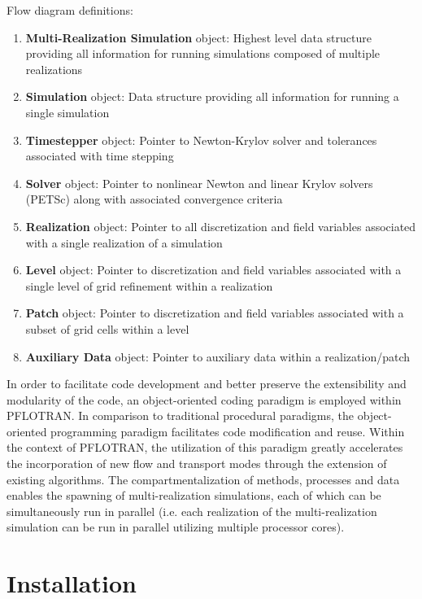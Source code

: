 \documentclass[12pt]{article}
\begin{document}
Flow diagram definitions:
\begin{enumerate}
\item {\bf Multi-Realization Simulation} object: Highest level data structure providing all information for running simulations composed of multiple realizations
\item {\bf Simulation} object: Data structure providing all information for running a single simulation
\item {\bf Timestepper} object: Pointer to Newton-Krylov solver and tolerances associated with time stepping
\item {\bf Solver} object: Pointer to nonlinear Newton and linear Krylov solvers (PETSc) along with associated convergence criteria
\item {\bf Realization} object: Pointer to all discretization and field variables associated with a single realization of a simulation
\item {\bf Level} object: Pointer to discretization and field variables associated with a single level of grid refinement within a realization
\item {\bf Patch} object: Pointer to discretization and field variables associated with a subset of grid cells within a level
\item {\bf Auxiliary Data} object: Pointer to auxiliary data within a realization/patch
\end{enumerate}


In order to facilitate code development and better preserve the extensibility and modularity of the code, an object-oriented coding paradigm is employed within PFLOTRAN.  In comparison to traditional procedural paradigms, the object-oriented programming paradigm facilitates code modification and reuse.  Within the context of PFLOTRAN, the utilization of this paradigm greatly accelerates the incorporation of new flow and transport modes through the extension of existing algorithms.  The compartmentalization of methods, processes and data enables the spawning of multi-realization simulations, each of which can be simultaneously run in parallel (i.e. each realization of the multi-realization simulation can be run in parallel utilizing multiple processor cores).

\section{Installation}

\setcounter{equation}{0}
\end{document}
